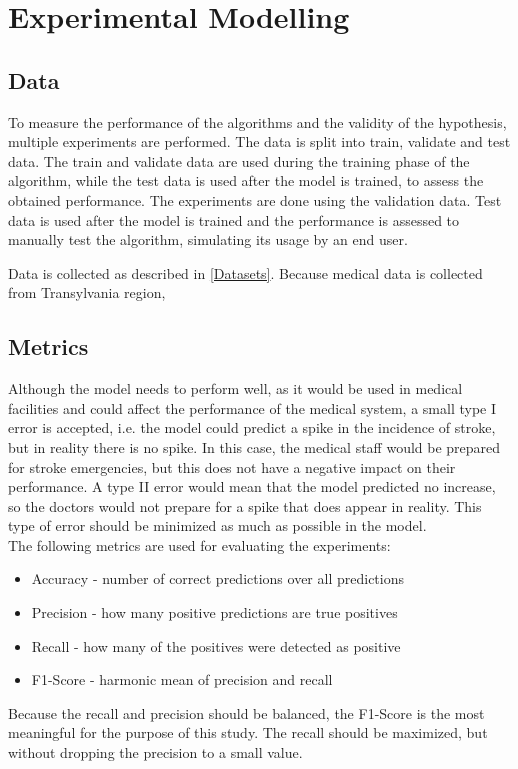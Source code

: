 \documentclass{article}
\begin{document}
\section{Experimental Modelling}

\subsection{Data}

To measure the performance of the algorithms and the validity of the hypothesis, multiple experiments are performed. The data is split into train, validate and test data. The train and validate data are used during the training phase of the algorithm, while the test data is used after the model is trained, to assess the obtained performance. The experiments are done using the validation data. Test data is used after the model is trained and the performance is assessed to manually test the algorithm, simulating its usage by an end user. 

Data is collected as described in \ref{Datasets}. Because medical data is collected from Transylvania region, 

\subsection{Metrics}

Although the model needs to perform well, as it would be used in medical facilities and could affect the performance of the medical system, a small type I error is accepted, i.e. the model could predict a spike in the incidence of stroke, but in reality there is no spike. In this case, the medical staff would be prepared for stroke emergencies, but this does not have a negative impact on their performance. A type II error would mean that the model predicted no increase, so the doctors would not prepare for a spike that does appear in reality. This type of error should be minimized as much as possible in the model.
\\

The following metrics are used for evaluating the experiments:
\begin{itemize}
    \item Accuracy - number of correct predictions over all predictions
    \item Precision - how many positive predictions are true positives
    \item Recall - how many of the positives were detected as positive
    \item F1-Score - harmonic mean of precision and recall
\end{itemize}
Because the recall and precision should be balanced, the F1-Score is the most meaningful for the purpose of this study. The recall should be maximized, but without dropping the precision to a small value.
\end{document}

